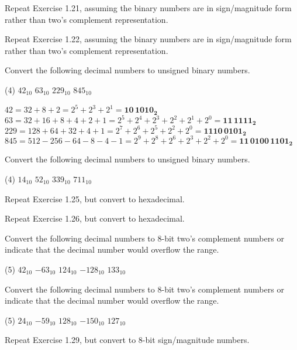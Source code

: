 \exercise %
Repeat Exercise 1.21, assuming the binary numbers are in sign/magnitude
form rather than two's complement representation.
\solution
{}

\exercise %
Repeat Exercise 1.22, assuming the binary numbers are in sign/magnitude
form rather than two's complement representation.
\solution
{}

\exercise %
Convert the following decimal numbers to unsigned
binary numbers.
\begin{tasks}(4)
	\task $42_{10}$
	\task $63_{10}$
	\task $229_{10}$
	\task $845_{10}$	
\end{tasks}
\solution
\begin{tasks}
	\task $42=32+8+2=2^5+2^3+2^1=\mathbf{10\,1010_2}$	
	\task $63=32+16+8+4+2+1=2^5+2^4+2^3+2^2+2^1+2^0=\mathbf{11\,1111_2}$
	\task $229=128+64+32+4+1=2^7+2^6+2^5+2^2+2^0=\mathbf{1110\,0101_2}$
	\task $845=512-256-64-8-4-1=2^9+2^8+2^6+2^3+2^2+2^0=\mathbf{11\,0100\,1101_2}$
\end{tasks}

\exercise %
Convert the following decimal numbers to unsigned binary numbers.
\begin{tasks}(4)
	\task $14_{10}$
	\task $52_{10}$
	\task $339_{10}$
	\task $711_{10}$
\end{tasks}

\exercise %
Repeat Exercise 1.25, but convert to hexadecimal.

\exercise %
Repeat Exercise 1.26, but convert to hexadecimal.

\exercise %
Convert the following decimal numbers to 8-bit two's complement numbers or
indicate that the decimal number would overflow the range.
\begin{tasks}(5)
	\task $42_{10}$
	\task $-63_{10}$
	\task $124_{10}$
	\task $-128_{10}$
	\task $133_{10}$
\end{tasks}

\exercise %
Convert the following decimal numbers to 8-bit two's complement numbers or
indicate that the decimal number would overflow the range.
\begin{tasks}(5)
	\task $24_{10}$
	\task $-59_{10}$
	\task $128_{10}$
	\task $-150_{10}$
	\task $127_{10}$
\end{tasks}

\exercise %
Repeat Exercise 1.29, but convert to 8-bit sign/magnitude numbers.

